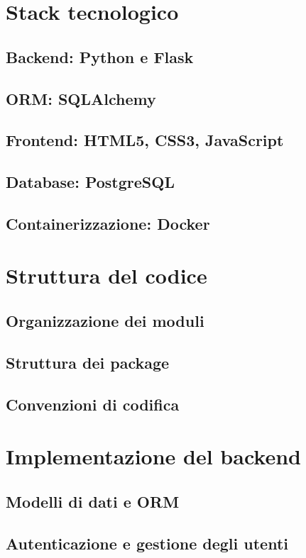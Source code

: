 \documentclass[12pt,a4paper,oneside]{report}
\begin{document}
\section{Stack tecnologico}
\subsection{Backend: Python e Flask}
\subsection{ORM: SQLAlchemy}
\subsection{Frontend: HTML5, CSS3, JavaScript}
\subsection{Database: PostgreSQL}
\subsection{Containerizzazione: Docker}

\section{Struttura del codice}
\subsection{Organizzazione dei moduli}
\subsection{Struttura dei package}
\subsection{Convenzioni di codifica}

\section{Implementazione del backend}
\subsection{Modelli di dati e ORM}
\subsection{Autenticazione e gestione degli utenti}
\end{document}
